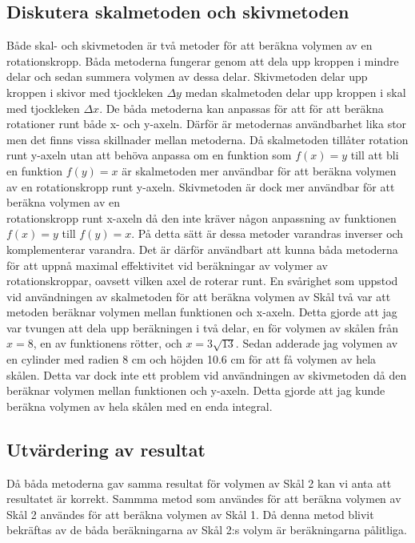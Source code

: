 \documentclass[12pt]{article}
\begin{document}
\subsection*{Diskutera skalmetoden och skivmetoden}
Både skal- och skivmetoden är två metoder för att beräkna volymen av en rotationskropp. Båda metoderna fungerar genom att dela upp kroppen i mindre delar och sedan summera volymen av dessa delar. Skivmetoden delar upp kroppen i skivor med tjockleken $\Delta y$ medan skalmetoden delar upp kroppen i skal med tjockleken $\Delta x$. De båda metoderna kan anpassas för att för att beräkna rotationer runt både x- och y-axeln. Därför är metodernas användbarhet lika stor men det finns vissa skillnader mellan metoderna. Då skalmetoden tillåter rotation runt y-axeln utan att behöva anpassa om en funktion som $f(x)=y$ till att bli en funktion $f(y)=x$ är skalmetoden mer användbar för att beräkna volymen av en rotationskropp runt y-axeln. Skivmetoden är dock mer användbar för att beräkna volymen av en\\ rotationskropp runt x-axeln då den inte kräver någon anpassning av funktionen $f(x)=y$ till $f(y)=x$. På detta sätt är dessa metoder varandras inverser och komplementerar varandra. Det är därför användbart att kunna båda metoderna för att uppnå maximal effektivitet vid beräkningar av volymer av rotationskroppar, oavsett vilken axel de roterar runt. En svårighet som uppstod vid användningen av skalmetoden för att beräkna volymen av Skål två var att metoden beräknar volymen mellan funktionen och x-axeln. Detta gjorde att jag var tvungen att dela upp beräkningen i två delar, en för volymen av skålen från $x=8$, en av funktionens rötter, och $x=3\sqrt{13}$. Sedan adderade jag volymen av en cylinder med radien 8 cm och höjden 10.6 cm för att få volymen av hela skålen. Detta var dock inte ett problem vid användningen av skivmetoden då den beräknar volymen mellan funktionen och y-axeln. Detta gjorde att jag kunde beräkna volymen av hela skålen med en enda integral.

\subsection*{Utvärdering av resultat}
Då båda metoderna gav samma resultat för volymen av Skål 2 kan vi anta att resultatet är korrekt. Sammma metod som användes för att beräkna volymen av Skål 2 användes för att beräkna volymen av Skål 1. Då denna metod blivit bekräftas av de båda beräkningarna av Skål 2:s volym är beräkningarna pålitliga.
\end{document}
